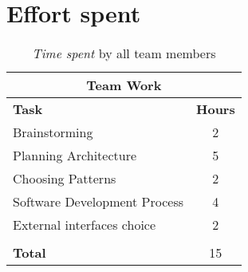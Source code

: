 \documentclass[../RASD.tex]{subfiles}
\begin{document}
    \chapter{Effort spent}\label{ch:effort-spent}
    \begin{table}[h]
        \centering
        \begin{tabular}{l c}
            \hline\hline
            \multicolumn{2}{c}{\textbf{Team Work}} \\
            \hline
            \textbf{Task} & \textbf{Hours} \\ [0.5ex]
            \hline
            Brainstorming & 2 \\
            Planning Architecture & 5 \\
            Choosing Patterns & 2 \\
            Software Development Process & 4  \\
            External interfaces choice & 2\\
             &   \\
            \hline
            \textbf{Total} & 15  \\
            \hline
        \end{tabular}
        \caption{\textit{Time spent} by all team members}
        \label{fig:Time spent by all team members}
    \end{table}
\end{document}
